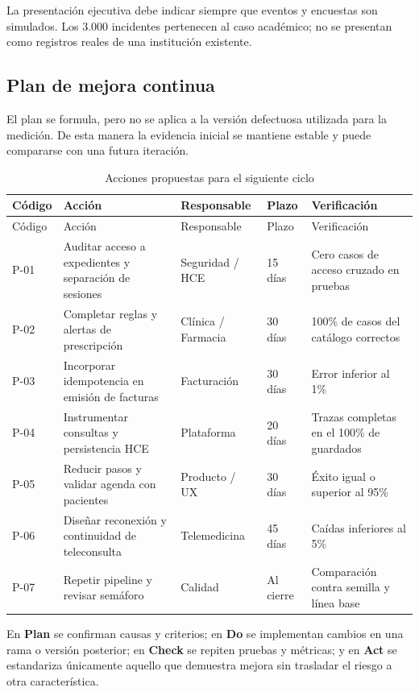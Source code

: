 La presentación ejecutiva debe indicar siempre que eventos y encuestas son simulados. Los 3.000 incidentes pertenecen al caso académico; no se presentan como registros reales de una institución existente.

\subsection{Plan de mejora continua}


El plan se formula, pero no se aplica a la versión defectuosa utilizada para la medición. De esta manera la evidencia inicial se mantiene estable y puede compararse con una futura iteración.

\begin{longtable}{p{1.3cm}p{3.55cm}p{2.4cm}p{2.1cm}p{2.5cm}}
\caption{Acciones propuestas para el siguiente ciclo}\label{tab:pdca}\\
\toprule
Código & Acción & Responsable & Plazo & Verificación \\
\midrule
\endfirsthead
\toprule
Código & Acción & Responsable & Plazo & Verificación \\
\midrule
\endhead
P-01 & Auditar acceso a expedientes y separación de sesiones & Seguridad / HCE & 15 días & Cero casos de acceso cruzado en pruebas \\
P-02 & Completar reglas y alertas de prescripción & Clínica / Farmacia & 30 días & 100\% de casos del catálogo correctos \\
P-03 & Incorporar idempotencia en emisión de facturas & Facturación & 30 días & Error inferior al 1\% \\
P-04 & Instrumentar consultas y persistencia HCE & Plataforma & 20 días & Trazas completas en el 100\% de guardados \\
P-05 & Reducir pasos y validar agenda con pacientes & Producto / UX & 30 días & Éxito igual o superior al 95\% \\
P-06 & Diseñar reconexión y continuidad de teleconsulta & Telemedicina & 45 días & Caídas inferiores al 5\% \\
P-07 & Repetir pipeline y revisar semáforo & Calidad & Al cierre & Comparación contra semilla y línea base \\
\bottomrule
\end{longtable}

En \textbf{Plan} se confirman causas y criterios; en \textbf{Do} se implementan cambios en una rama o versión posterior; en \textbf{Check} se repiten pruebas y métricas; y en \textbf{Act} se estandariza únicamente aquello que demuestra mejora sin trasladar el riesgo a otra característica.
